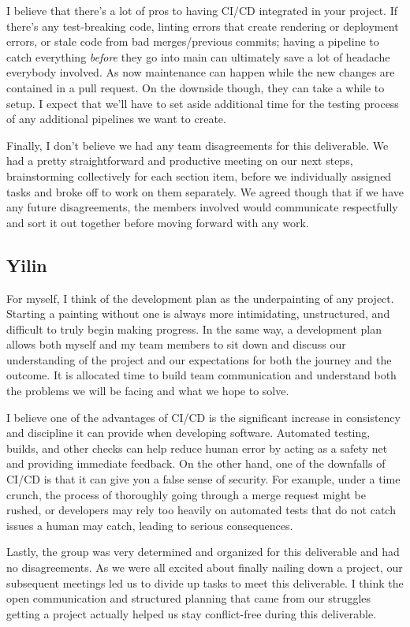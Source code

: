 \documentclass{article}
\begin{document}
I believe that there's a lot of pros to having CI/CD integrated in your project.
If there's any test-breaking code, linting errors that create rendering
or deployment errors, or stale code from bad merges/previous commits; 
having a pipeline to catch everything \textit{before} they go into main
can ultimately save a lot of headache everybody involved. As now maintenance can happen
while the new changes are contained in a pull request. On the downside though, they can take a while
to setup. I expect that we'll have to set aside additional time for the 
testing process of any additional pipelines we want to create.

Finally, I don't believe we had any team disagreements for this deliverable. We had a 
pretty straightforward and productive meeting on our next steps, brainstorming
collectively for each section item, before we individually assigned tasks and
broke off to work on them separately. We agreed though that if we have any future
disagreements, the members involved would communicate respectfully and sort it out 
together before moving forward with any work. 

\subsection*{Yilin}
For myself, I think of the development plan as the underpainting of any project. 
Starting a painting without one is always more intimidating, unstructured, and difficult to truly begin making progress. 
In the same way, a development plan allows both myself and my team members to sit down and discuss our understanding 
of the project and our expectations for both the journey and the outcome. It is allocated time to build team communication 
and understand both the problems we will be facing and what we hope to solve.

I believe one of the advantages of CI/CD is the significant increase in consistency and discipline it can provide when 
developing software. Automated testing, builds, and other checks can help reduce human error by acting as a safety net and 
providing immediate feedback. On the other hand, one of the downfalls of CI/CD is that it can give you a false sense of security. 
For example, under a time crunch, the process of thoroughly going through a merge request might be rushed, or developers may rely 
too heavily on automated tests that do not catch issues a human may catch, leading to serious consequences.

Lastly, the group was very determined and organized for this deliverable and had no disagreements. As we were all excited about 
finally nailing down a project, our subsequent meetings led us to divide up tasks to meet this deliverable. I think the open communication 
and structured planning that came from our struggles getting a project actually helped us stay conflict-free during this deliverable.
\end{document}
